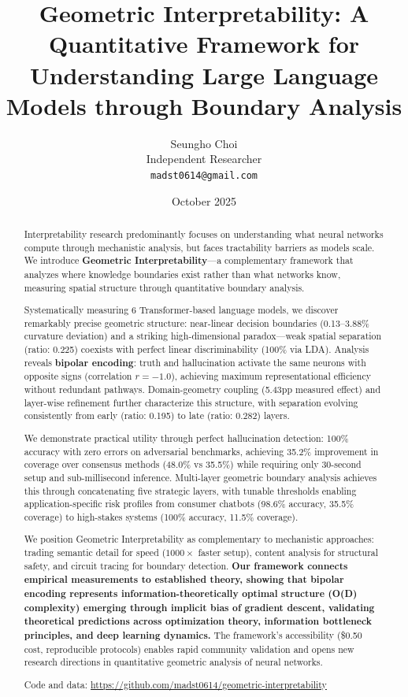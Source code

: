 \documentclass[11pt]{article}
\title{\textbf{Geometric Interpretability: A Quantitative Framework for Understanding Large Language Models through Boundary Analysis}}
\author{
Seungho Choi \\
Independent Researcher \\
\texttt{madst0614@gmail.com}
}
\date{October 2025}
\begin{document}
\maketitle

\begin{abstract}
Interpretability research predominantly focuses on understanding what neural networks compute through mechanistic analysis, but faces tractability barriers as models scale. We introduce \textbf{Geometric Interpretability}---a complementary framework that analyzes where knowledge boundaries exist rather than what networks know, measuring spatial structure through quantitative boundary analysis.

Systematically measuring 6 Transformer-based language models, we discover remarkably precise geometric structure: near-linear decision boundaries (0.13--3.88\% curvature deviation) and a striking high-dimensional paradox---weak spatial separation (ratio: 0.225) coexists with perfect linear discriminability (100\% via LDA). Analysis reveals \textbf{bipolar encoding}: truth and hallucination activate the same neurons with opposite signs (correlation $r = -1.0$), achieving maximum representational efficiency without redundant pathways. Domain-geometry coupling (5.43pp measured effect) and layer-wise refinement further characterize this structure, with separation evolving consistently from early (ratio: 0.195) to late (ratio: 0.282) layers.

We demonstrate practical utility through perfect hallucination detection: 100\% accuracy with zero errors on adversarial benchmarks, achieving 35.2\% improvement in coverage over consensus methods (48.0\% vs 35.5\%) while requiring only 30-second setup and sub-millisecond inference. Multi-layer geometric boundary analysis achieves this through concatenating five strategic layers, with tunable thresholds enabling application-specific risk profiles from consumer chatbots (98.6\% accuracy, 35.5\% coverage) to high-stakes systems (100\% accuracy, 11.5\% coverage).

We position Geometric Interpretability as complementary to mechanistic approaches: trading semantic detail for speed ($1000\times$ faster setup), content analysis for structural safety, and circuit tracing for boundary detection. \textbf{Our framework connects empirical measurements to established theory, showing that bipolar encoding represents information-theoretically optimal structure (O(D) complexity) emerging through implicit bias of gradient descent, validating theoretical predictions across optimization theory, information bottleneck principles, and deep learning dynamics.} The framework's accessibility (\$0.50 cost, reproducible protocols) enables rapid community validation and opens new research directions in quantitative geometric analysis of neural networks.

\noindent Code and data: \url{https://github.com/madst0614/geometric-interpretability}
\end{abstract}
\end{document}
